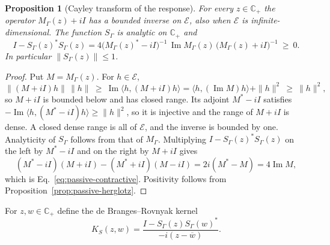 \documentclass[11pt]{article}
\newtheorem{proposition}{Proposition}[section]
\theoremstyle{definition}
\newcommand{\C}{\mathbb C}
\begin{document}
\begin{proposition}[Cayley transform of the response]
\label{prop:passive-cayley}
For every $z\in\C_+$ the operator $M_\Gamma(z)+iI$ has a bounded inverse on $\mathcal E$, also when $\mathcal E$ is infinite-dimensional. The function $S_\Gamma$ is analytic on $\C_+$ and
\begin{equation}
 I-S_\Gamma(z)^*S_\Gamma(z)
  =4\bigl(M_\Gamma(z)^*-iI\bigr)^{-1}\,\operatorname{Im}M_\Gamma(z)\,\bigl(M_\Gamma(z)+iI\bigr)^{-1}\ \geq\ 0 .
 \label{eq:passive-contractive}
\end{equation}
In particular $\|S_\Gamma(z)\|\le1$.
\end{proposition}
\begin{proof}
Put $M=M_\Gamma(z)$. For $h\in\mathcal E$,
\[
 \|(M+iI)h\|\,\|h\|\ \ge\ \operatorname{Im}\langle h,(M+iI)h\rangle
   =\langle h,(\operatorname{Im}M)h\rangle+\|h\|^2\ \ge\ \|h\|^2 ,
\]
so $M+iI$ is bounded below and has closed range. Its adjoint $M^*-iI$ satisfies $-\operatorname{Im}\langle h,(M^*-iI)h\rangle\ge\|h\|^2$, so it is injective and the range of $M+iI$ is dense. A closed dense range is all of $\mathcal E$, and the inverse is bounded by one. Analyticity of $S_\Gamma$ follows from that of $M_\Gamma$. Multiplying $I-S_\Gamma(z)^*S_\Gamma(z)$ on the left by $M^*-iI$ and on the right by $M+iI$ gives
\[
 (M^*-iI)(M+iI)-(M^*+iI)(M-iI)=2i(M^*-M)=4\operatorname{Im}M ,
\]
which is Eq.~\eqref{eq:passive-contractive}. Positivity follows from Proposition~\ref{prop:passive-herglotz}.
\end{proof}

For $z,w\in\C_+$ define the de Branges--Rovnyak kernel
\begin{equation}
 K_S(z,w)=\frac{I-S_\Gamma(z)S_\Gamma(w)^*}{-i(z-\overline w)} .
 \label{eq:passive-dbr-kernel}
\end{equation}
\end{document}
